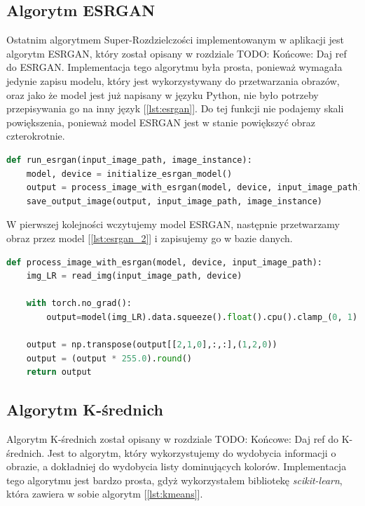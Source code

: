 \subsection*{Algorytm ESRGAN}

Ostatnim algorytmem Super-Rozdzielczości implementowanym w aplikacji jest algorytm ESRGAN, który został opisany w rozdziale 
TODO: Końcowe: Daj ref do ESRGAN.
Implementacja tego algorytmu była prosta, ponieważ wymagała jedynie zapisu modelu, który jest wykorzystywany do przetwarzania obrazów, oraz jako że model jest już napisany w języku Python, nie było potrzeby przepisywania go na inny język [\ref{lst:esrgan}]. Do tej funkcji nie podajemy skali powiększenia, ponieważ model ESRGAN jest w stanie powiększyć obraz czterokrotnie.

\begin{lstlisting}[language=Python, caption=Implementacja algorytmu ESRGAN., label={lst:esrgan}]    
def run_esrgan(input_image_path, image_instance):
    model, device = initialize_esrgan_model()
    output = process_image_with_esrgan(model, device, input_image_path)
    save_output_image(output, input_image_path, image_instance)
\end{lstlisting}

W pierwszej kolejności wczytujemy model ESRGAN, następnie przetwarzamy obraz przez model [\ref{lst:esrgan_2}] i zapisujemy go w bazie danych.


\begin{lstlisting}[language=Python, caption=Przetwarzanie przez model ESRGAN., label={lst:esrgan_2}]
def process_image_with_esrgan(model, device, input_image_path):
    img_LR = read_img(input_image_path, device)

    with torch.no_grad():
        output=model(img_LR).data.squeeze().float().cpu().clamp_(0, 1).numpy()
    
    output = np.transpose(output[[2,1,0],:,:],(1,2,0))
    output = (output * 255.0).round()
    return output
\end{lstlisting}


\subsection*{Algorytm K-średnich}

Algorytm K-średnich został opisany w rozdziale
TODO: Końcowe: Daj ref do K-średnich.
Jest to algorytm, który wykorzystujemy do wydobycia informacji o obrazie, a dokładniej do wydobycia listy dominujących kolorów. Implementacja tego algorytmu jest bardzo prosta, gdyż wykorzystałem bibliotekę \textit{scikit-learn}, która zawiera w sobie algorytm [\ref{lst:kmeans}].


